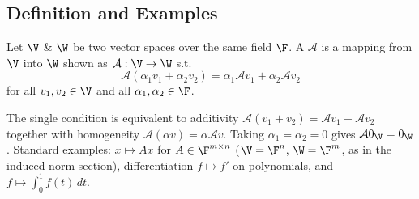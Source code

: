 \subsection{Definition and Examples}\label{ss:lt-def}
\begin{definition}
Let $\V$ \& $\W$ be two vector spaces over the same field $\F$. A  $\mathcal{A}$ is a mapping from $\V$ into $\W$ shown as $\mathcal{A}:\V\to\W$ s.t.
\[
\mathcal{A}(\alpha_1 v_1 + \alpha_2 v_2) = \alpha_1\mathcal{A}v_1 + \alpha_2\mathcal{A}v_2
\]
for all $v_1,v_2\in\V$ and all $\alpha_1,\alpha_2\in\F$.
\end{definition}
\begin{center}
\end{center}
\begin{insight}
The single condition is equivalent to additivity $\mathcal A(v_1+v_2) = \mathcal Av_1+\mathcal Av_2$ together with homogeneity $\mathcal A(\alpha v) = \alpha\mathcal Av$. Taking $\alpha_1=\alpha_2=0$ gives $\mathcal A 0_\V = 0_\W$. Standard examples: $x\mapsto Ax$ for $A\in\F^{m\times n}$ ($\V=\F^n$, $\W=\F^m$, as in the induced-norm section), differentiation $f\mapsto f'$ on polynomials, and $f\mapsto\int_0^1 f(t)\,dt$.
\end{insight}
